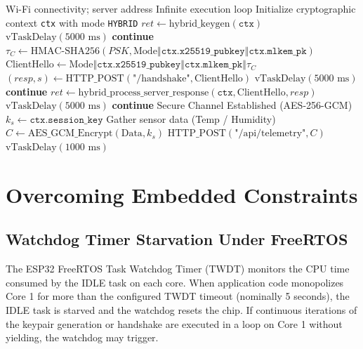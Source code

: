 \documentclass[journal, 10pt]{IEEEtran}
\begin{document}
\begin{algorithm}[!t]
\caption{Stateful Telemetry and Key Rotation Loop (\texttt{pqc\_task})}
\begin{algorithmic}[1]
\REQUIRE Wi-Fi connectivity; server address
\ENSURE Infinite execution loop
\WHILE{\TRUE}
    \STATE Initialize cryptographic context \texttt{ctx} with mode \texttt{HYBRID}
    \STATE $\mathit{ret} \leftarrow \text{hybrid\_keygen}(\texttt{ctx})$
        \STATE $\text{vTaskDelay}(5000\text{ ms})$ \textbf{continue}
    \ENDIF
    \STATE $\tau_C \leftarrow \text{HMAC-SHA256}(PSK, \text{Mode} \mathbin{\Vert} \texttt{ctx.x25519\_pubkey} \mathbin{\Vert} \texttt{ctx.mlkem\_pk})$
    \STATE $\text{ClientHello} \leftarrow \text{Mode} \mathbin{\Vert} \texttt{ctx.x25519\_pubkey} \mathbin{\Vert} \texttt{ctx.mlkem\_pk} \mathbin{\Vert} \tau_C$
    \STATE $(\mathit{resp}, s) \leftarrow \text{HTTP\_POST}(\text{"/handshake"}, \text{ClientHello})$
        \STATE $\text{vTaskDelay}(5000\text{ ms})$ \textbf{continue}
    \ENDIF
    \STATE $\mathit{ret} \leftarrow \text{hybrid\_process\_server\_response}(\texttt{ctx}, \text{ClientHello}, \mathit{resp})$
        \STATE $\text{vTaskDelay}(5000\text{ ms})$ \textbf{continue}
    \ENDIF
    \STATE Secure Channel Established (AES-256-GCM)
    \STATE $k_s \leftarrow \texttt{ctx.session\_key}$
        \STATE Gather sensor data (Temp / Humidity)
        \STATE $C \leftarrow \text{AES\_GCM\_Encrypt}(\text{Data}, k_s)$
        \STATE $\text{HTTP\_POST}(\text{"/api/telemetry"}, C)$
        \STATE $\text{vTaskDelay}(1000\text{ ms})$
    \ENDFOR
\ENDWHILE
\end{algorithmic}
\end{algorithm}

\section{Overcoming Embedded Constraints}
\subsection{Watchdog Timer Starvation Under FreeRTOS}
The ESP32 FreeRTOS Task Watchdog Timer (TWDT) monitors the CPU time consumed by the IDLE task on each core. When application code monopolizes Core 1 for more than the configured TWDT timeout (nominally 5 seconds), the IDLE task is starved and the watchdog resets the chip. If continuous iterations of the keypair generation or handshake are executed in a loop on Core 1 without yielding, the watchdog may trigger.
\end{document}
